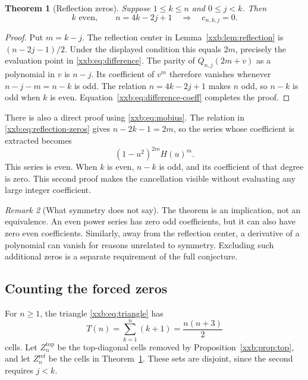 \documentclass[11pt,a4paper]{article}
\numberwithin{equation}{section}
\newtheorem{theorem}{Theorem}[section]
\theoremstyle{definition}
\theoremstyle{remark}
\newtheorem{remark}[theorem]{Remark}
\theoremstyle{plain}
\begin{document}
\begin{theorem}[Reflection zeros]\label{xxb:thm:reflection-zeros}
Suppose $1\le k\le n$ and $0\le j<k$. Then
\begin{equation}\label{xxb:eq:reflection-zeros}
 k\text{ even},\qquad n=4k-2j+1
 \quad\Longrightarrow\quad c_{n,k,j}=0.
\end{equation}
\end{theorem}
\begin{proof}
Put $m=k-j$. The reflection center in Lemma~\ref{xxb:lem:reflection} is
$(n-2j-1)/2$. Under the displayed condition this equals $2m$, precisely
the evaluation point in \eqref{xxb:eq:difference}. The parity of
$Q_{n,j}(2m+v)$ as a polynomial in $v$ is $n-j$. Its coefficient of $v^m$
therefore vanishes whenever $n-j-m=n-k$ is odd. The relation
$n=4k-2j+1$ makes $n$ odd, so $n-k$ is odd when $k$ is even.
Equation~\eqref{xxb:eq:difference-coeff} completes the proof.
\end{proof}

There is also a direct proof using \eqref{xxb:eq:mobius}. The relation in
\eqref{xxb:eq:reflection-zeros} gives $n-2k-1=2m$, so the series whose
coefficient is extracted becomes
\begin{equation}\label{xxb:eq:even-kernel}
 (1-u^2)^{2m}H(u)^m.
\end{equation}
This series is even. When $k$ is even, $n-k$ is odd, and its coefficient
of that degree is zero. This second proof makes the cancellation visible
without evaluating any large integer coefficient.

\begin{remark}[What symmetry does not say]\label{xxb:rem:symmetry-gap}
The theorem is an implication, not an equivalence. An even power series
has zero odd coefficients, but it can also have zero even coefficients.
Similarly, away from the reflection center, a derivative of a polynomial
can vanish for reasons unrelated to symmetry. Excluding such additional
zeros is a separate requirement of the full conjecture.
\end{remark}

\subsection{Counting the forced zeros}\label{xxb:sec:counting}
For $n\ge1$, the triangle \eqref{xxb:eq:triangle} has
\begin{equation}\label{xxb:eq:triangle-size}
 T(n)=\sum_{k=1}^n(k+1)=\frac{n(n+3)}2
\end{equation}
cells. Let $Z_n^{\mathrm{top}}$ be the top-diagonal cells removed by
Proposition~\ref{xxb:prop:top}, and let $Z_n^{\mathrm{ref}}$ be the cells in
Theorem~\ref{xxb:thm:reflection-zeros}. These sets are disjoint, since the
second requires $j<k$.
\end{document}
